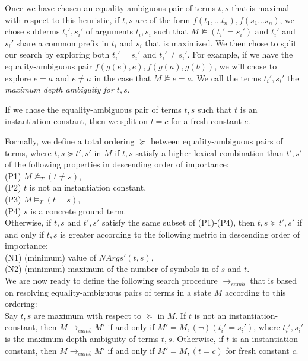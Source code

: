\documentclass{llncs}
\begin{document}
Once we have chosen an equality-ambiguous pair of terms $t,s$ that is maximal with respect to this heuristic, if $t, s$ are of the form $f( t_1, \ldots t_n ), f( s_1 \ldots s_n)$, we chose subterms $t_i', s_i'$ of arguments $t_i, s_i$ such that $M \not\models ( t_i' = s_i' )$ and $t_i'$ and $s_i'$ share a common prefix in $t_i$ and $s_i$ that is maximized.
We then chose to split our search by exploring both $t_i' = s_i'$ and $t_i' \neq s_i'$.
For example, if we have the equality-ambiguous pair $f( g( e ), e ), f( g( a ), g( b ) )$, we will chose to explore $e = a$ and $e \neq a$ in the case that $M \not\models e = a$.
We call the terms $t_i', s_i'$ the \emph{maximum depth ambiguity for $t, s$}.

If we chose the equality-ambiguous pair of terms $t,s$ such that $t$ is an instantiation constant, then we split on $t = c$ for a fresh constant $c$.

Formally, we define a total ordering $\succeq$ between equality-ambiguous pairs of terms, where $t,s \succeq t',s'$ in $M$ if $t,s$ satisfy a higher lexical combination than $t',s'$ of the following properties in descending order of importance:  \\
(P1) $M \not\models_T (t \neq s)$, \\
(P2) $t$ is not an instantiation constant, \\ 
(P3) $M \models_T (t = s)$, \\
(P4) $s$ is a concrete ground term. \\
Otherwise, if $t,s$ and $t',s'$ satisfy the same subset of (P1)-(P4), then $t,s \succeq t',s'$ if and only if $t,s$ is greater according to the following metric in descending order of importance: \\
(N1) (minimum) value of $NArgs'( t, s )$, \\
(N2) (minimum) maximum of the number of symbols in of $s$ and $t$. \\

We are now ready to define the following search procedure $\rightarrow_{eamb}$ that is based on resolving equality-ambiguous pairs of terms in a state $M$ according to this ordering: \\

Say $t, s$ are maximum with respect to $\succeq$ in $M$.
If $t$ is not an instantiation-constant, then $M \rightarrow_{eamb} M'$ if and only if $M' = M, (\neg)(t_i' = s_i')$, where $t_i', s_i'$ is the maximum depth ambiguity of terms $t, s$.
Otherwise, if $t$ is an instantiation constant, then $M \rightarrow_{eamb} M'$ if and only if $M' = M, (t = c)$ for fresh constant $c$. \\
\end{document}
